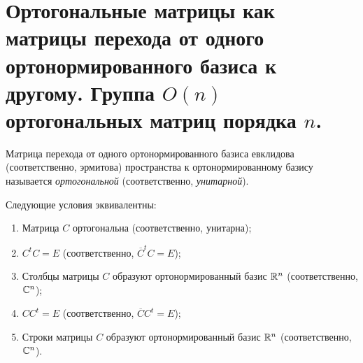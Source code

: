 \section{Ортогональные матрицы как матрицы перехода от одного ортонормированного базиса
к другому. Группа $O(n)$ ортогональных матриц порядка $n$.}

\begin{definition}
    Матрица перехода от одного ортонормированного базиса евклидова (соответственно, эрмитова) пространства к ортонормированному базису называется \textit{ортогональной} (соответственно, \textit{унитарной}).
\end{definition}

\begin{proposal}
    Следующие условия эквивалентны:
    \begin{enumerate}[nolistsep]
        \item Матрица $C$ ортогональна (соответственно, унитарна);
        \item $C^tC = E$ (соответственно, $\overline{C}^tC = E$);
        \item Столбцы матрицы $C$ образуют ортонормированный базис $\mathbb{R}^n$ (соответственно, $\mathbb{C}^n$);
        \item $CC^t = E$ (соответственно, $\overline{C}C^t = E$);
        \item Строки матрицы $C$ образуют ортонормированный базис $\mathbb{R}^n$ (соответственно, $\mathbb{C}^n$).
    \end{enumerate}
\end{proposal}

